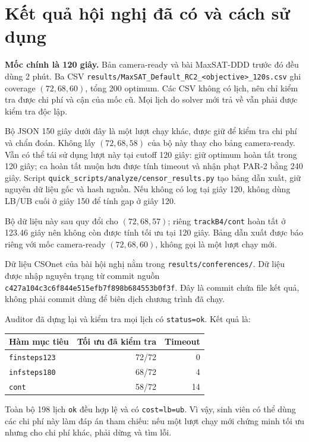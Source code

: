 \documentclass[11pt,a4paper]{article}
\newcommand{\code}[1]{\texttt{#1}}
\newcommand{\file}[1]{\nolinkurl{#1}}
\begin{document}
\section{Kết quả hội nghị đã có và cách sử dụng}

\textbf{Mốc chính là 120 giây.} Bản camera-ready và bài MaxSAT-DDD trước đó
đều dùng 2 phút. Ba CSV
\file{results/MaxSAT_Default_RC2_<objective>_120s.csv} ghi coverage
$(72,68,60)$, tổng 200 optimum. Các CSV không có lịch, nên chỉ kiểm tra được
chi phí và cận của mốc cũ. Mọi lịch do solver mới trả về vẫn phải được kiểm
tra độc lập.

Bộ JSON 150 giây dưới đây là một lượt chạy khác, được giữ để kiểm tra chi phí
và chẩn đoán. Không lấy $(72,68,58)$ của bộ này thay cho bảng camera-ready.
Vẫn có thể tái sử dụng lượt này tại cutoff 120 giây: giữ optimum hoàn tất
trong 120 giây; ca hoàn tất muộn hơn được tính timeout và nhận phạt PAR-2
bằng 240 giây. Script \file{quick_scripts/analyze/censor_results.py} tạo bảng
dẫn xuất, giữ nguyên dữ liệu gốc và hash nguồn. Nếu không có log tại giây
120, không dùng LB/UB cuối ở giây 150 để tính gap ở giây 120.

Bộ dữ liệu này sau quy đổi cho $(72,68,57)$; riêng \code{trackB4/cont} hoàn
tất ở 123.46 giây nên không còn được tính tối ưu tại 120 giây. Bảng dẫn xuất
được báo riêng với mốc camera-ready $(72,68,60)$, không gọi là một lượt chạy mới.

Dữ liệu CSOnet của bài hội nghị nằm trong
\file{results/conferences/}. Dữ liệu được nhập nguyên trạng từ commit nguồn
\code{c427a104c3c6f844e515efb7f898b684553b0f3f}. Đây là commit chứa file kết
quả, không phải commit dùng để biên dịch chương trình đã chạy.

Auditor đã dựng lại và kiểm tra mọi lịch có \code{status=ok}. Kết quả là:

\begin{center}
\begin{tabular}{@{}lrr@{}}
\toprule
Hàm mục tiêu & Tối ưu đã kiểm tra & Timeout \\
\midrule
\code{finsteps123} & 72/72 & 0 \\
\code{infsteps180} & 68/72 & 4 \\
\code{cont} & 58/72 & 14 \\
\bottomrule
\end{tabular}
\end{center}

Toàn bộ 198 lịch \code{ok} đều hợp lệ và có \code{cost=lb=ub}. Vì vậy, sinh
viên có thể dùng các chi phí này làm đáp án tham chiếu: nếu một lượt chạy mới
chứng minh tối ưu nhưng cho chi phí khác, phải dừng và tìm lỗi.
\end{document}
